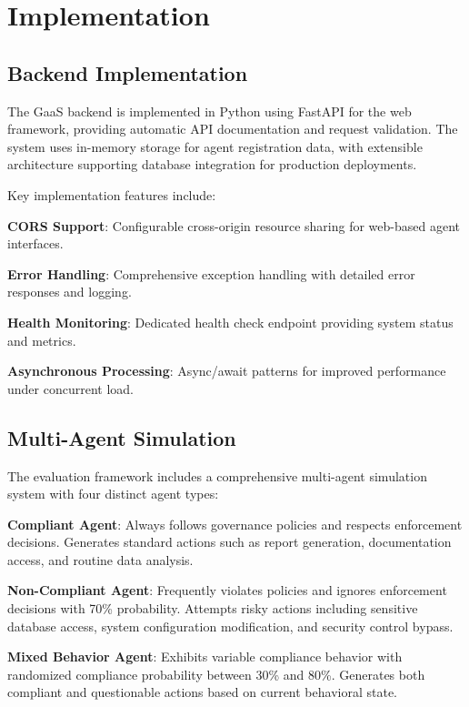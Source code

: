 \documentclass[letterpaper]{article}
\begin{document}
\section{Implementation}

\subsection{Backend Implementation}

The GaaS backend is implemented in Python using FastAPI for the web framework, providing automatic API documentation and request validation. The system uses in-memory storage for agent registration data, with extensible architecture supporting database integration for production deployments.

Key implementation features include:

\textbf{CORS Support}: Configurable cross-origin resource sharing for web-based agent interfaces.

\textbf{Error Handling}: Comprehensive exception handling with detailed error responses and logging.

\textbf{Health Monitoring}: Dedicated health check endpoint providing system status and metrics.

\textbf{Asynchronous Processing}: Async/await patterns for improved performance under concurrent load.

\subsection{Multi-Agent Simulation}

The evaluation framework includes a comprehensive multi-agent simulation system with four distinct agent types:

\textbf{Compliant Agent}: Always follows governance policies and respects enforcement decisions. Generates standard actions such as report generation, documentation access, and routine data analysis.

\textbf{Non-Compliant Agent}: Frequently violates policies and ignores enforcement decisions with 70\% probability. Attempts risky actions including sensitive database access, system configuration modification, and security control bypass.

\textbf{Mixed Behavior Agent}: Exhibits variable compliance behavior with randomized compliance probability between 30\% and 80\%. Generates both compliant and questionable actions based on current behavioral state.
\end{document}
